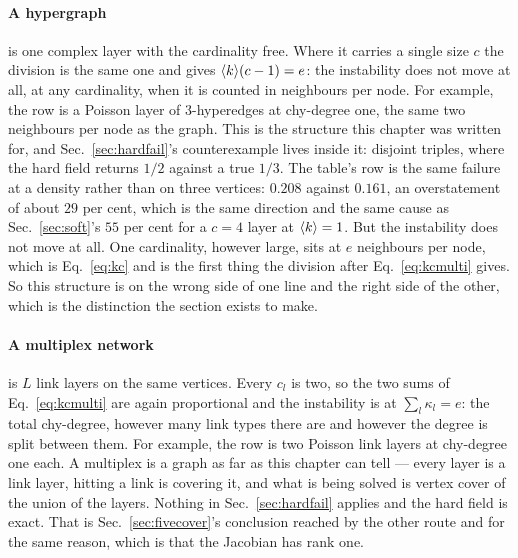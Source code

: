 \paragraph{A hypergraph} is one complex layer with the cardinality free. Where
it carries a single size $c$ the division is the same one and gives
$\langle k \rangle(c-1)=e$: the instability does not move at all, at
any cardinality, when it is counted in neighbours per node. For example, the
row is a Poisson layer of $3$-hyperedges at chy-degree one, the same two
neighbours per node as the graph. This is the structure this chapter was
written for, and
Sec.~\ref{sec:hardfail}'s counterexample lives inside it: disjoint triples,
where the hard field returns $1/2$ against a true $1/3$. The table's row is the
same failure at a density rather than on three vertices: $0.208$ against
$0.161$, an overstatement of about $29$ per cent, which is the same direction
and the same cause as Sec.~\ref{sec:soft}'s $55$ per cent for a $c=4$ layer at
$\langle k \rangle=1$. But the
instability does not move at all. One cardinality, however large, sits at $e$
neighbours per node, which is Eq.~\eqref{eq:kc} and is the first thing the
division after Eq.~\eqref{eq:kcmulti} gives. So this structure is on the wrong
side of one line and the right side of the other, which is the distinction the
section exists to make.

\paragraph{A multiplex network} is $L$ link layers on the same vertices. Every
$c_{l}$ is two, so the two sums of Eq.~\eqref{eq:kcmulti} are again
proportional and the instability is at $\sum_{l}\kappa_{l}=e$: the total
chy-degree, however many link types there are and however the degree is split
between them. For example, the row is two Poisson link layers at chy-degree one
each. A multiplex is a graph as far as this chapter can tell --- every layer is
a link layer, hitting a link is covering it, and what is being solved is vertex
cover of the union of the layers. Nothing in Sec.~\ref{sec:hardfail} applies
and the hard field is exact. That is Sec.~\ref{sec:fivecover}'s conclusion
reached by the other route and for the same reason, which is that the Jacobian
has rank one.

